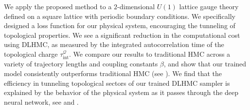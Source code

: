\documentclass{article} %
\begin{document}
   
We apply the proposed method to a \(2\)-dimensional \(U(1)\) lattice gauge theory defined on a
      square lattice with periodic boundary conditions.
We specifically designed a loss function for our physical system,
encouraging the tunneling of topological properties.
      We see a significant reduction in the
      computational cost using DLHMC, as measured by the integrated autocorrelation time of the topological charge
      \(\tau_{\mathrm{int}}^{\mathcal{Q}}\).
      We compare our results to traditional HMC across a variety of trajectory lengths and coupling constants
      \(\beta\), and show that our trained model consistently outperforms traditional HMC (see
      ).
%
We find that the efficiency in tunneling topological sectors of our trained DLHMC sampler
is explained by the behavior of the physical system as it passes through the deep neural network,
see  and .
%
\end{document}
